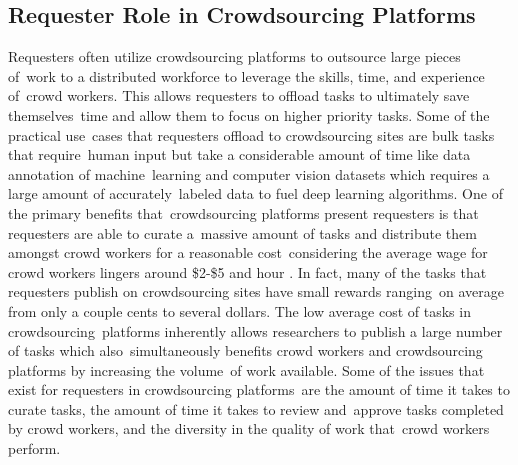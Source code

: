 \documentclass[letterpaper,12pt]{article}
\begin{document}
\subsection{Requester Role in Crowdsourcing Platforms}
Requesters often utilize crowdsourcing platforms to outsource large pieces of\ 
work to a distributed workforce to leverage the skills, time, and experience of\ 
crowd workers. \cite{kuek2015global} This allows requesters to offload tasks to ultimately save themselves\ 
time and allow them to focus on higher priority tasks. Some of the practical use\ 
cases that requesters offload to crowdsourcing sites are bulk tasks that require\ 
human input but take a considerable amount of time like data annotation of machine\ 
learning and computer vision datasets which requires a large amount of accurately\ 
labeled data to fuel deep learning algorithms. One of the primary benefits that\
crowdsourcing platforms present requesters is that requesters are able to curate a\ 
massive amount of tasks and distribute them amongst crowd workers for a reasonable cost\ 
considering the average wage for crowd workers lingers around \$2-\$5 and hour \cite{Kaplan2018,hara2018data}.
In fact, many of the tasks that requesters publish on crowdsourcing sites have small rewards ranging\
on average from only a couple cents to several dollars. The low average cost of tasks in crowdsourcing\
platforms inherently allows researchers to publish a large number of tasks which also\
simultaneously benefits crowd workers and crowdsourcing platforms by increasing the volume\
of work available. Some of the issues that exist for requesters in crowdsourcing platforms\
are the amount of time it takes to curate tasks, the amount of time it takes to review and\
approve tasks completed by crowd workers, and the diversity in the quality of work that\
crowd workers perform.
\end{document}
